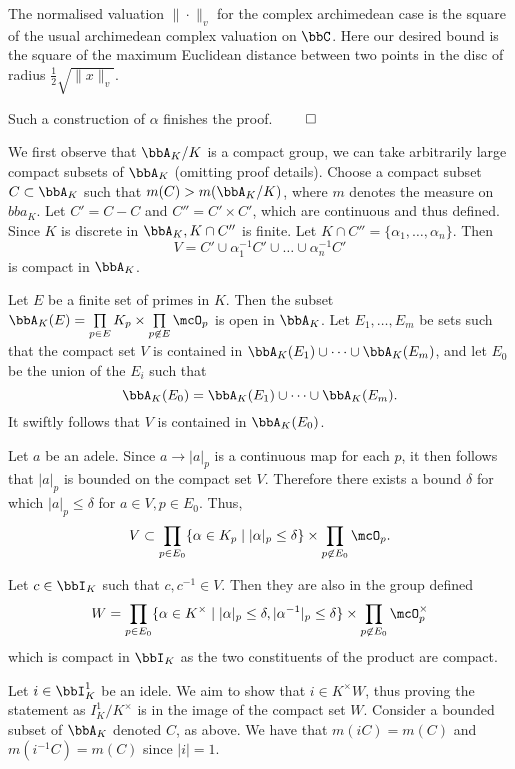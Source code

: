 \documentclass[a4paper, 12pt,oneside,openany]{book}
\begin{document}
The normalised valuation $\|\cdot \|_v$ for the complex archimedean case is the square of the usual archimedean complex valuation on $\bbC$. Here our desired bound is the square of the maximum Euclidean distance between two points in the disc of radius $\frac{1}{2}\sqrt{\|x\|_v}$.

Such a construction of $\alpha$ finishes the proof. $\qed$


 We first observe that $\bbA_K/K$ is a compact group, we can take arbitrarily large compact subsets of $\bbA_K$ (omitting proof details). Choose a compact subset $C \subset \bbA_K$ such that $m(C) > m(\bbA_K/K)$, where $m$ denotes the measure on $bba_K$. Let $C' = C-C$ and $C'' = C'\times C'$, which are continuous and thus defined. Since $K$ is discrete in $\bbA_K, K \cap C''$ is finite. Let $K \cap C'' = \{\alpha_1, \dots, \alpha_n\}.$ Then $$V = C' \cup \alpha_1^{-1} C' \cup \dots \cup \alpha_n^{-1} C'$$ is compact in $\bbA_K$. 

Let $E$ be a finite set of primes in $K$. Then the subset $\bbA_K(E) = \prod\limits_{p \in E} K_p \times \prod\limits_{p \not\in E} \mcO_p$ is open in $\bbA_K$. Let $E_1, \dots, E_m$ be sets such that the compact set $V$ is contained in $\bbA_K(E_1) \cup \dots \cup \bbA_K(E_m)$, and let $E_0$ be the union of the $E_i$ such that $$\bbA_K(E_0)=\bbA_K(E_1) \cup \dots \cup \bbA_K(E_m).$$ It swiftly follows that $V$ is contained in $\bbA_K(E_0)$. 

Let $a$ be an adele. Since $a \to |a|_p$ is a continuous map for each $p$, it then follows that $|a|_p$ is bounded on the compact set $V$. Therefore there exists a bound $\delta$ for which $|a|_p \leq \delta$ for $ a\in V, p \in E_0$. Thus, $$V \subset \prod\limits_{p \in E_0} \{\alpha \in K_p \mid |\alpha|_p \leq \delta\} \times \prod\limits_{p \not\in E_0} \mcO_p.$$

Let $c \in \bbI_K$ such that $c, c^{-1} \in V$. Then they are also in the group defined $$W= \prod\limits_{p \in E_0} \{\alpha \in K^\times \mid |\alpha|_p \leq \delta, |\alpha^{-1}|_p \leq \delta\} \times \prod\limits_{p \not\in E_0} \mcO_p^\times$$ which is compact in $\bbI_K$ as the two constituents of the product are compact.

Let $i \in \bbI_K^1$ be an idele. We aim to show that $i \in K^\times W$, thus proving the statement as $I_K^1/K^\times$ is in the image of the compact set $W$. Consider a bounded subset of $\bbA_K$ denoted $C$, as above. We have that $m(iC)=m(C)$ and $m(i^{-1}C)=m(C)$ since $|i|=1$. 
\end{document}
